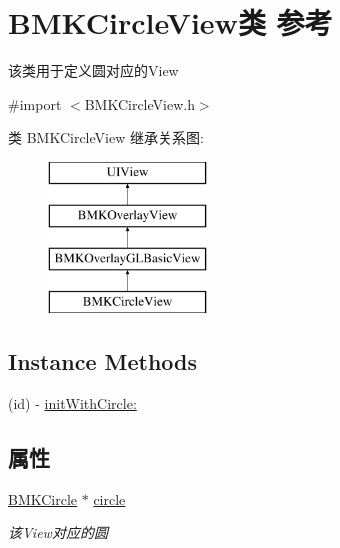 \hypertarget{interface_b_m_k_circle_view}{}\section{B\+M\+K\+Circle\+View类 参考}
\label{interface_b_m_k_circle_view}


该类用于定义圆对应的\+View  




{\ttfamily \#import $<$B\+M\+K\+Circle\+View.\+h$>$}

类 B\+M\+K\+Circle\+View 继承关系图\+:\begin{figure}[H]
\begin{center}
\leavevmode
\includegraphics[height=4.000000cm]{interface_b_m_k_circle_view}
\end{center}
\end{figure}
\subsection*{Instance Methods}
\begin{DoxyCompactItemize}
\item 
(id) -\/ \hyperlink{interface_b_m_k_circle_view_a35f06526cf5423a39d434edc0517d34e}{init\+With\+Circle\+:}
\end{DoxyCompactItemize}
\subsection*{属性}
\begin{DoxyCompactItemize}
\item 
\hypertarget{interface_b_m_k_circle_view_a07fe8c131d40bb225849dbc9bfb17e18}{}\hyperlink{interface_b_m_k_circle}{B\+M\+K\+Circle} $\ast$ \hyperlink{interface_b_m_k_circle_view_a07fe8c131d40bb225849dbc9bfb17e18}{circle}\label{interface_b_m_k_circle_view_a07fe8c131d40bb225849dbc9bfb17e18}

\begin{DoxyCompactList}\small\item\em 该\+View对应的圆 \end{DoxyCompactList}\end{DoxyCompactItemize}
